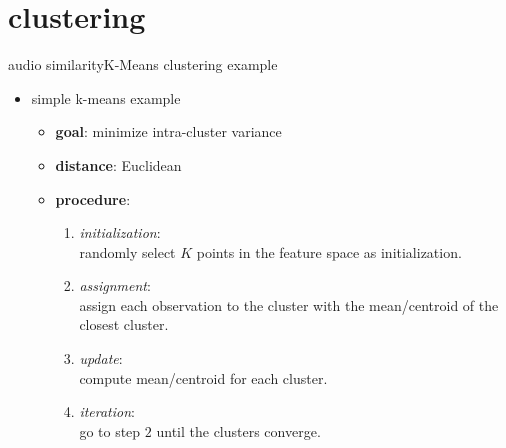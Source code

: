     \section{clustering}
        \begin{frame}{audio similarity}{K-Means clustering example}
            \begin{itemize}
                \item   simple k-means example
                    \begin{itemize}
                        \item   \textbf{goal}: minimize intra-cluster variance
                        \item   \textbf{distance}: Euclidean
                        \item   \textbf{procedure}:
                            \begin{enumerate}
                                \item	\textit{initialization}:\\ randomly select $K$ points in the feature space as initialization.
                                \item<2->	\textit{assignment}:\\ assign each observation to the cluster with the mean/centroid of the closest cluster.
                                \item<3->	\textit{update}:\\ compute mean/centroid for each cluster.
                                \item<4->	\textit{iteration}:\\ go to step $2$ until the clusters converge.
                            \end{enumerate}
                    \end{itemize}
            \end{itemize}
        \end{frame}
